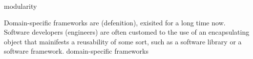 modularity



Domain-specific frameworks are (defenition), exisited for a long time now. Software developers (engineers) are often customed to the use of an encapsulating object that mainifests a reusability of some sort, such as a software library or a software framework. domain-specific frameworks




